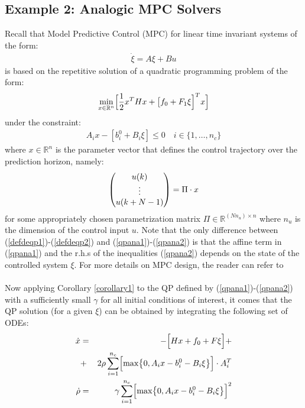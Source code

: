 \documentclass{article}
\begin{document}
\subsection{Example 2: Analogic MPC Solvers} \label{circuits} 
\noindent Recall that Model Predictive Control (MPC) for linear time invariant systems of the form:
\begin{eqnarray}
\dot \xi=A\xi+Bu
\end{eqnarray} 
is based on the repetitive solution of a quadratic programming problem of the form:
\begin{eqnarray}
\min_{x\in \mathbb{R}^{n}} \Bigl[\dfrac{1}{2}x^THx+\bigl[f_0+F_1\xi\Bigr]^Tx\Bigr] \label{qpana1} 
\end{eqnarray} 
under the constraint:
\begin{eqnarray}
A_ix-\left[b_i^0+B_i\xi\right]\le 0\quad i\in \{1,\dots,n_c\} \label{qpana2} 
\end{eqnarray} 
where $x\in \mathbb{R}^{n}$ is the parameter vector that defines the control trajectory over the prediction horizon, namely:
\begin{eqnarray}
\begin{pmatrix}
u(k)\cr \vdots\cr u(k+N-1)
\end{pmatrix}=\Pi\cdot x
\end{eqnarray}  
for some appropriately chosen parametrization matrix $\Pi\in \mathbb{R}^{(Nn_u)\times n}$ where $n_u$ is the dimension of the control input $u$. Note that the only difference between (\ref{defdeqp1})-(\ref{defdeqp2}) and (\ref{qpana1})-(\ref{qpana2}) is that the affine term in (\ref{qpana1}) and the r.h.s of the inequalities (\ref{qpana2}) depends on the state of the controlled system $\xi$. For more details on MPC design, the reader can refer to \cite{Mayne:2000} \ \\ \ \\ 
Now applying Corollary \ref{corollary1} to the QP defined by  (\ref{qpana1})-(\ref{qpana2}) with a sufficiently small $\gamma$ for all initial conditions of interest, it comes that the QP solution (for a given $\xi$) can be obtained by integrating the following set of ODEs:
\begin{eqnarray}
\dot x&=&-\Bigl[Hx+f_0+F\xi\Bigr]+\nonumber \\ &+&2\rho\sum_{i=1}^{n_c}\Bigl[\max\bigl\{0,A_ix-b_i^0-B_i\xi\bigr\}\Bigr]\cdot A_i^T \label{tgfr4} \\
\dot \rho&=&\gamma \sum_{i=1}^{n_c}\Bigl[\max\bigl\{0,A_ix-b_i^0-B_i\xi\bigr\}\Bigr]^2 \label{tgfr5} 
\end{eqnarray} 
\end{document}
